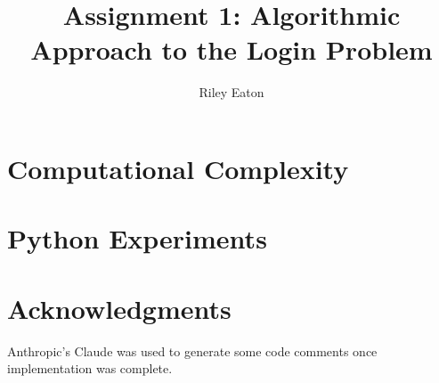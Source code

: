 \documentclass[acmsmall,screen]{acmart}
\title{Assignment 1: Algorithmic Approach to the Login Problem}
\author{Riley Eaton}
\affiliation{%
  \institution{University of British Columbia}
  \city{Kelowna}
  \state{BC}
  \country{Canada}
}
\begin{document}
\fancyfoot{} %

\maketitle

\section{Computational Complexity} \label{sec:complexity}


\section{Python Experiments} \label{sec:experiments}





\section*{Acknowledgments}
Anthropic's Claude was used to generate some code comments once implementation was complete.
\end{document}
